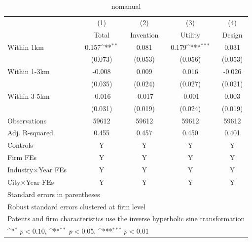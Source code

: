 \begin{table}[htbp]\centering
\def\sym#1{\ifmmode^{#1}\else\(^{#1}\)\fi}
\caption{nomanual}
\begin{tabular}{l*{4}{c}}
\toprule
            &\multicolumn{1}{c}{(1)}&\multicolumn{1}{c}{(2)}&\multicolumn{1}{c}{(3)}&\multicolumn{1}{c}{(4)}\\
            &\multicolumn{1}{c}{Total}&\multicolumn{1}{c}{Invention}&\multicolumn{1}{c}{Utility}&\multicolumn{1}{c}{Design}\\
\midrule
Within 1km  &       0.157\sym{**} &       0.081         &       0.179\sym{***}&       0.031         \\
            &     (0.073)         &     (0.053)         &     (0.056)         &     (0.053)         \\
\addlinespace
Within 1-3km&      -0.008         &       0.009         &       0.016         &      -0.026         \\
            &     (0.035)         &     (0.024)         &     (0.027)         &     (0.021)         \\
\addlinespace
Within 3-5km&      -0.016         &      -0.017         &      -0.001         &       0.003         \\
            &     (0.031)         &     (0.019)         &     (0.024)         &     (0.019)         \\
\midrule
Observations&       59612         &       59612         &       59612         &       59612         \\
Adj. R-squared&       0.455         &       0.457         &       0.450         &       0.401         \\
Controls    &           Y         &           Y         &           Y         &           Y         \\
Firm FEs    &           Y         &           Y         &           Y         &           Y         \\
Industry$\times$Year FEs&           Y         &           Y         &           Y         &           Y         \\
City$\times$Year FEs&           Y         &           Y         &           Y         &           Y         \\
\bottomrule
\multicolumn{5}{l}{\footnotesize Standard errors in parentheses}\\
\multicolumn{5}{l}{\footnotesize Robust standard errors clustered at firm level}\\
\multicolumn{5}{l}{\footnotesize Patents and firm characteristics use the inverse hyperbolic sine transformation}\\
\multicolumn{5}{l}{\footnotesize \sym{*} \(p<0.10\), \sym{**} \(p<0.05\), \sym{***} \(p<0.01\)}\\
\end{tabular}
\end{table}
